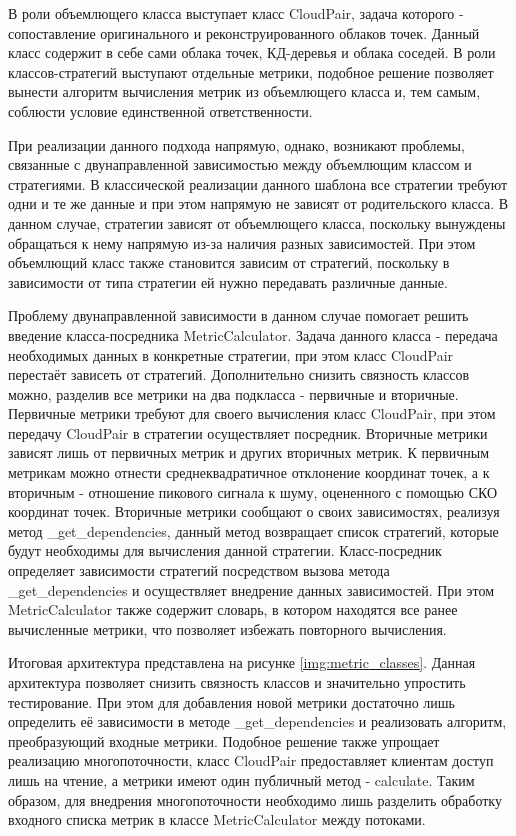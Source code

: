 В роли объемлющего класса выступает класс CloudPair, задача которого -
сопоставление оригинального и реконструированного облаков точек. Данный класс
содержит в себе сами облака точек, КД-деревья и облака соседей. В роли
классов-стратегий выступают отдельные метрики, подобное решение позволяет
вынести алгоритм вычисления метрик из объемлющего класса и, тем самым, соблюсти
условие единственной ответственности.

При реализации данного подхода напрямую, однако, возникают проблемы, связанные с
двунаправленной зависимостью между объемлющим классом и стратегиями. В
классической реализации данного шаблона все стратегии требуют одни и те же
данные и при этом напрямую не зависят от родительского класса. В данном случае,
стратегии зависят от объемлющего класса, поскольку вынуждены обращаться к нему
напрямую из-за наличия разных зависимостей. При этом объемлющий класс также
становится зависим от стратегий, поскольку в зависимости от типа стратегии ей
нужно передавать различные данные.

Проблему двунаправленной зависимости в данном случае помогает решить введение
класса-посредника MetricCalculator. Задача данного класса - передача необходимых
данных в конкретные стратегии, при этом класс CloudPair перестаёт зависеть от
стратегий. Дополнительно снизить связность классов можно, разделив все метрики
на два подкласса - первичные и вторичные. Первичные метрики требуют для своего
вычисления класс CloudPair, при этом передачу CloudPair в стратегии осуществляет
посредник. Вторичные метрики зависят лишь от первичных метрик и других вторичных
метрик. К первичным метрикам можно отнести среднеквадратичное отклонение
координат точек, а к вторичным - отношение пикового сигнала к шуму, оцененного с
помощью СКО координат точек. Вторичные метрики сообщают о своих зависимостях,
реализуя метод \_get\_dependencies, данный метод возвращает список стратегий,
которые будут необходимы для вычисления данной стратегии. Класс-посредник
определяет зависимости стратегий посредством вызова метода \_get\_dependencies и
осуществляет внедрение данных зависимостей. При этом MetricCalculator также
содержит словарь, в котором находятся все ранее вычисленные метрики, что
позволяет избежать повторного вычисления.


Итоговая архитектура представлена на рисунке \ref{img:metric_classes}. Данная
архитектура позволяет снизить связность классов и значительно упростить
тестирование. При этом для добавления новой метрики достаточно лишь определить
её зависимости в методе \_get\_dependencies и реализовать алгоритм, преобразующий
входные метрики. Подобное решение также упрощает реализацию многопоточности,
класс CloudPair предоставляет клиентам доступ лишь на чтение, а метрики имеют
один публичный метод - calculate. Таким образом, для внедрения многопоточности
необходимо лишь разделить обработку входного списка метрик в классе
MetricCalculator между потоками.

